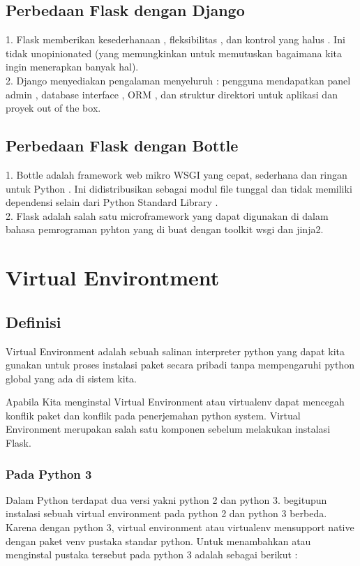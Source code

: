 \documentclass[12pt,a4paper]{article}
\begin{document}
\subsection{Perbedaan Flask dengan Django}
1.	Flask memberikan kesederhanaan , fleksibilitas , dan kontrol yang halus . Ini tidak unopinionated (yang memungkinkan untuk memutuskan bagaimana kita ingin menerapkan banyak hal).\\
2.  Django menyediakan pengalaman menyeluruh : pengguna mendapatkan panel admin , database interface , ORM , dan struktur direktori untuk aplikasi dan proyek out of the box.
\subsection{Perbedaan Flask dengan Bottle}
1.	Bottle adalah framework web mikro WSGI yang cepat, sederhana dan ringan untuk Python . Ini didistribusikan sebagai modul file tunggal dan tidak memiliki dependensi selain dari Python Standard Library .\\
2.	Flask adalah salah satu microframework yang dapat digunakan di dalam bahasa pemrograman pyhton yang di buat dengan toolkit wsgi dan jinja2.

\section{Virtual Environtment}
\subsection{Definisi}
\hspace{1cm} Virtual Environment adalah sebuah salinan interpreter python yang dapat kita gunakan untuk proses instalasi paket secara pribadi tanpa mempengaruhi python global yang ada di sistem kita.

Apabila Kita menginstal Virtual Environment atau virtualenv dapat mencegah konflik paket dan konflik pada penerjemahan python system. Virtual Environment merupakan salah satu komponen sebelum melakukan instalasi Flask.
\subsubsection{Pada Python 3}
Dalam Python terdapat dua versi yakni python 2 dan python 3. begitupun instalasi sebuah virtual environment pada python 2 dan python 3 berbeda. Karena dengan python 3, virtual environment atau virtualenv mensupport native dengan paket venv pustaka standar python. Untuk menambahkan atau menginstal pustaka tersebut pada python 3 adalah sebagai berikut :
\end{document}
